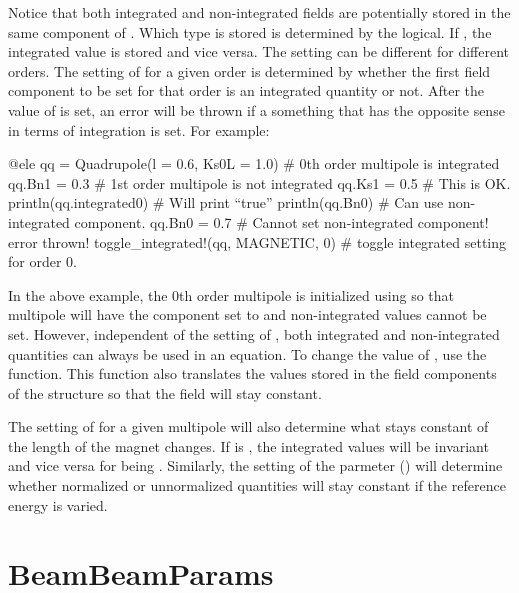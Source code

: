 Notice that both integrated
and non-integrated fields are potentially stored in the same component of .
Which type is stored is determined by the  logical. If , the integrated
value is stored and vice versa. The  setting can be different for different orders.
The setting of  for a given order is determined by whether the first field component
to be set for that order is an integrated quantity or not. After the value of  is set,
an error will be thrown if a something that has the opposite sense in terms of integration is 
set. For example:
\begin{example}
  @ele qq = Quadrupole(l = 0.6, Ks0L = 1.0)  # 0th order multipole is integrated
  qq.Bn1 = 0.3                  # 1st order multipole is not integrated
  qq.Ks1 = 0.5                  # This is OK.
  println(qq.integrated0)       # Will print ``true''
  println(qq.Bn0)               # Can use non-integrated component.
  qq.Bn0 = 0.7                  # Cannot set non-integrated component! error thrown!
  toggle_integrated!(qq, MAGNETIC, 0)  # toggle integrated setting for order 0.
\end{example}
In the above example, the 0th order multipole is initialized using  so that
multipole will have the  component set to  and non-integrated values
cannot be set. However, independent of the setting of , both integrated and
non-integrated quantities can always be used in an equation. To change the value of ,
use the  function. This function also translates the values stored in the
field components of the structure so that the field will stay constant.

The setting of  for a given multipole will also determine what stays constant
of the length of the magnet changes. If  is , the integrated values
will be invariant and vice versa for  being . Similarly, the setting
of the  parmeter () will determine whether normalized or
unnormalized quantities will stay constant if the reference energy is varied.

\section{BeamBeamParams}
\label{s:beam.beam.g}

